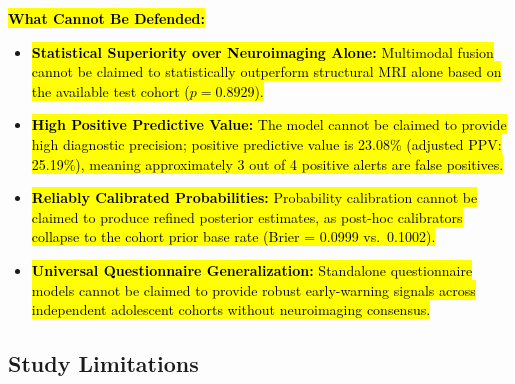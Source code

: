 \documentclass[10pt,letterpaper]{article}
\begin{document}
\hl{\textbf{What Cannot Be Defended:}}
\begin{itemize}
    \item \hl{\textbf{Statistical Superiority over Neuroimaging Alone:} Multimodal fusion cannot be claimed to statistically outperform structural MRI alone based on the available test cohort ($p = 0.8929$).}
    \item \hl{\textbf{High Positive Predictive Value:} The model cannot be claimed to provide high diagnostic precision; positive predictive value is 23.08\% (adjusted PPV: 25.19\%), meaning approximately 3 out of 4 positive alerts are false positives.}
    \item \hl{\textbf{Reliably Calibrated Probabilities:} Probability calibration cannot be claimed to produce refined posterior estimates, as post-hoc calibrators collapse to the cohort prior base rate (Brier = 0.0999 vs.\ 0.1002).}
    \item \hl{\textbf{Universal Questionnaire Generalization:} Standalone questionnaire models cannot be claimed to provide robust early-warning signals across independent adolescent cohorts without neuroimaging consensus.}
\end{itemize}

\subsection*{Study Limitations}
\end{document}
